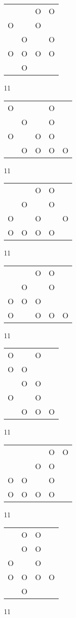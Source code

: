 \begin{tabular}{|m{0.2cm}m{0.2cm}m{0.2cm}m{0.2cm}|}\hline
 & &O&O\\
O& &O& \\
 &O& &O\\
O&O&O&O\\
 &O& & \\
\hline\end{tabular}11
\begin{tabular}{|m{0.2cm}m{0.2cm}m{0.2cm}m{0.2cm}m{0.2cm}|}\hline
O& & &O& \\
 &O& &O& \\
O& &O&O& \\
 &O&O&O&O\\
\hline\end{tabular}11
\begin{tabular}{|m{0.2cm}m{0.2cm}m{0.2cm}m{0.2cm}m{0.2cm}|}\hline
 & &O&O& \\
 &O& &O& \\
O& &O& &O\\
O&O&O&O& \\
\hline\end{tabular}11
\begin{tabular}{|m{0.2cm}m{0.2cm}m{0.2cm}m{0.2cm}m{0.2cm}|}\hline
 & &O&O& \\
 &O& &O& \\
O&O&O& & \\
O& &O&O&O\\
\hline\end{tabular}11
\begin{tabular}{|m{0.2cm}m{0.2cm}m{0.2cm}m{0.2cm}|}\hline
O& &O& \\
O&O& & \\
 &O&O& \\
O& &O& \\
 &O&O&O\\
\hline\end{tabular}11
\begin{tabular}{|m{0.2cm}m{0.2cm}m{0.2cm}m{0.2cm}m{0.2cm}|}\hline
 & & &O&O\\
 & &O&O& \\
O&O& &O& \\
O&O&O&O& \\
\hline\end{tabular}11
\begin{tabular}{|m{0.2cm}m{0.2cm}m{0.2cm}m{0.2cm}|}\hline
 &O&O& \\
 &O&O& \\
O& &O& \\
O&O&O&O\\
 &O& & \\
\hline\end{tabular}11
